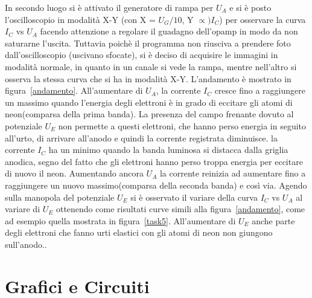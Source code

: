\documentclass[10pt,a4paper]{article}
\begin{document}
In secondo luogo si è attivato il generatore di rampa per $U_{A}$ e si è posto l'oscilloscopio in modalità X-Y (con X = $U_{G}/10$, Y $\propto) I_{C}$) per osservare la curva $I_{C}$ vs $U_{A}$ facendo attenzione a regolare il guadagno dell'opamp in modo da non saturarne l'uscita. Tuttavia poichè il programma non riusciva a prendere foto dall'oscilloscopio (uscivano sfocate), si è deciso di acquisire le immagini in modalità normale, in quanto in un canale si vede la rampa, mentre nell'altro si osserva la stessa curva che si ha in modalità X-Y.
L'andamento è mostrato in figura~\ref{andamento}.
All'aumentare di $U_{A}$, la corrente $I_{C}$ cresce fino a raggiungere un massimo quando l'energia degli elettroni è in grado di eccitare gli atomi di neon(comparsa della prima banda). La presenza del campo frenante dovuto al potenziale $U_{E}$ non permette a questi elettroni, che hanno perso energia in seguito all'urto, di arrivare all'anodo e quindi la corrente registrata diminuisce. la corrente $I_{C}$ ha un minimo quando la banda luminosa si distacca dalla griglia anodica, segno del fatto che gli elettroni hanno perso troppa energia per eccitare di nuovo il neon.
Aumentando ancora $U_{A}$ la corrente reinizia ad aumentare fino a raggiungere un nuovo massimo(comparsa della seconda banda) e così via.
Agendo sulla manopola del potenziale $U_{E}$ si è osservato il variare della curva $I_{C}$ vs $U_{A}$ al variare di $U_{E}$ ottenendo come risultati curve simili alla figura~\ref{andamento}, come ad esempio quella mostrata in figura~\ref{task5}. All'aumentare di $U_{E}$ anche parte degli elettroni che fanno urti elastici con gli atomi di neon non giungono sull'anodo..%
  

 \subsection{}

\section{Grafici e Circuiti}
\end{document}
